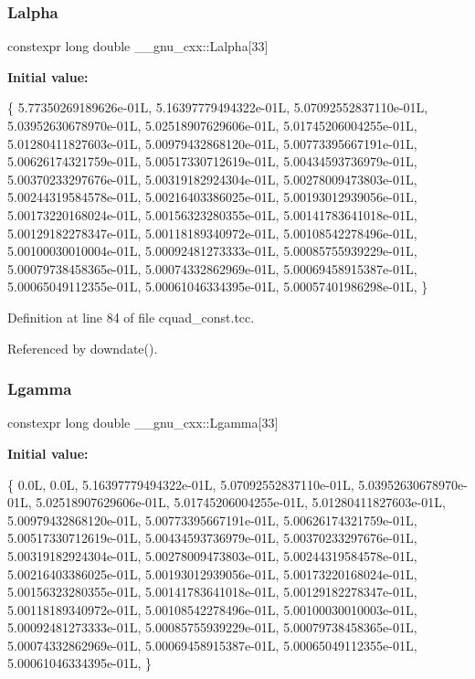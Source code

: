 \subsubsection{\texorpdfstring{Lalpha}{Lalpha}}
{\footnotesize\ttfamily constexpr long double \+\_\+\+\_\+gnu\+\_\+cxx\+::\+Lalpha\mbox{[}33\mbox{]}}

{\bfseries Initial value\+:}
\begin{DoxyCode}
\{
   5.77350269189626e-01L, 5.16397779494322e-01L, 5.07092552837110e-01L,
   5.03952630678970e-01L, 5.02518907629606e-01L, 5.01745206004255e-01L,
   5.01280411827603e-01L, 5.00979432868120e-01L, 5.00773395667191e-01L,
   5.00626174321759e-01L, 5.00517330712619e-01L, 5.00434593736979e-01L,
   5.00370233297676e-01L, 5.00319182924304e-01L, 5.00278009473803e-01L,
   5.00244319584578e-01L, 5.00216403386025e-01L, 5.00193012939056e-01L,
   5.00173220168024e-01L, 5.00156323280355e-01L, 5.00141783641018e-01L,
   5.00129182278347e-01L, 5.00118189340972e-01L, 5.00108542278496e-01L,
   5.00100030010004e-01L, 5.00092481273333e-01L, 5.00085755939229e-01L,
   5.00079738458365e-01L, 5.00074332862969e-01L, 5.00069458915387e-01L,
   5.00065049112355e-01L, 5.00061046334395e-01L, 5.00057401986298e-01L,
\}
\end{DoxyCode}


Definition at line 84 of file cquad\+\_\+const.\+tcc.



Referenced by downdate().

\mbox{\label{namespace____gnu__cxx_a8148a5d125951ff217becb9212005bea}} 
\subsubsection{\texorpdfstring{Lgamma}{Lgamma}}
{\footnotesize\ttfamily constexpr long double \+\_\+\+\_\+gnu\+\_\+cxx\+::\+Lgamma\mbox{[}33\mbox{]}}

{\bfseries Initial value\+:}
\begin{DoxyCode}
\{
   0.0L, 0.0L, 5.16397779494322e-01L,
   5.07092552837110e-01L, 5.03952630678970e-01L,
   5.02518907629606e-01L, 5.01745206004255e-01L, 5.01280411827603e-01L,
   5.00979432868120e-01L, 5.00773395667191e-01L, 5.00626174321759e-01L,
   5.00517330712619e-01L, 5.00434593736979e-01L, 5.00370233297676e-01L,
   5.00319182924304e-01L, 5.00278009473803e-01L, 5.00244319584578e-01L,
   5.00216403386025e-01L, 5.00193012939056e-01L, 5.00173220168024e-01L,
   5.00156323280355e-01L, 5.00141783641018e-01L, 5.00129182278347e-01L,
   5.00118189340972e-01L, 5.00108542278496e-01L, 5.00100030010003e-01L,
   5.00092481273333e-01L, 5.00085755939229e-01L, 5.00079738458365e-01L,
   5.00074332862969e-01L, 5.00069458915387e-01L, 5.00065049112355e-01L,
   5.00061046334395e-01L,
\}
\end{DoxyCode}


